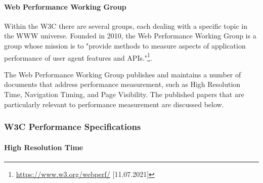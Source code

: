 

\paragraph{Web Performance Working Group} %


Within the W3C there are several groups, each dealing with a specific topic in the WWW universe. %
Founded in 2010, the Web Performance Working Group is a group whose mission is to "provide methods to measure aspects of application performance of user agent features and APIs."\footnote{\url{https://www.w3.org/webperf/} [11.07.2021]}.


The Web Performance Working Group publishes and maintains a number of documents that address performance measurement, such as High Resolution Time, Navigation Timing, and Page Visibility. %
The published papers that are particularly relevant to performance measurement are discussed below.





\subsubsection{W3C Performance Specifications}
\label{subsubsection:w3c_performance_specifications}


\paragraph{High Resolution Time} %

